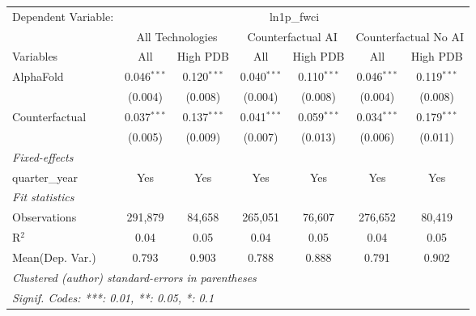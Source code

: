 \begingroup
\centering
\begin{tabular}{lcccccc}
   \tabularnewline \midrule \midrule
   Dependent Variable: & \multicolumn{6}{c}{ln1p\_fwci}\\
 & \multicolumn{2}{c}{All Technologies} & \multicolumn{2}{c}{Counterfactual AI} & \multicolumn{2}{c}{Counterfactual No AI} \\
\cmidrule(lr){1-1}\cmidrule(lr){2-3} \cmidrule(lr){4-5} \cmidrule(lr){6-7}
Variables & \multicolumn{1}{c}{All} & \multicolumn{1}{c}{High PDB} & \multicolumn{1}{c}{All} & \multicolumn{1}{c}{High PDB} & \multicolumn{1}{c}{All} & \multicolumn{1}{c}{High PDB} \\
\cmidrule(lr){1-1}\cmidrule(lr){2-2} \cmidrule(lr){3-3} \cmidrule(lr){4-4} \cmidrule(lr){5-5} \cmidrule(lr){6-6} \cmidrule(lr){7-7}
   AlphaFold      & 0.046$^{***}$ & 0.120$^{***}$ & 0.040$^{***}$ & 0.110$^{***}$ & 0.046$^{***}$ & 0.119$^{***}$\\   
                  & (0.004)       & (0.008)       & (0.004)       & (0.008)       & (0.004)       & (0.008)\\   
   Counterfactual & 0.037$^{***}$ & 0.137$^{***}$ & 0.041$^{***}$ & 0.059$^{***}$ & 0.034$^{***}$ & 0.179$^{***}$\\   
                  & (0.005)       & (0.009)       & (0.007)       & (0.013)       & (0.006)       & (0.011)\\   
   \midrule
   \emph{Fixed-effects}\\
   quarter\_year  & Yes           & Yes           & Yes           & Yes           & Yes           & Yes\\  
   \midrule
   \emph{Fit statistics}\\
   Observations   & 291,879       & 84,658        & 265,051       & 76,607        & 276,652       & 80,419\\  
   R$^2$          & 0.04          & 0.05          & 0.04          & 0.05          & 0.04          & 0.05\\  
Mean(Dep. Var.) & 0.793 & 0.903 & 0.788 & 0.888 & 0.791 & 0.902 \\
   \midrule \midrule
   \multicolumn{7}{l}{\emph{Clustered (author) standard-errors in parentheses}}\\
   \multicolumn{7}{l}{\emph{Signif. Codes: ***: 0.01, **: 0.05, *: 0.1}}\\
\end{tabular}
\par\endgroup
